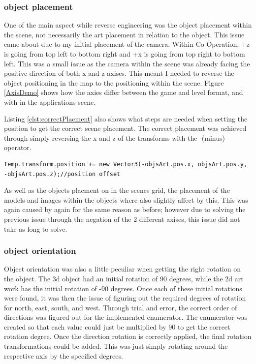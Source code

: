 \subsubsection{object placement}
One of the main aspect while reverse engineering was the object placement within the scene, not necessarily the art placement in relation to the object. This issue came about due to my initial placement of the camera. Within Co-Operation, +z is going from top left to bottom right and +x is going from top right to bottom left. This was a small issue as the camera within the scene was already facing the positive direction of both x and z axises. This meant I needed to reverse the object positioning in the map to the positioning within the scene. Figure \ref{AxisDemo} shows how the axies differ between the game and level format, and with in the applications scene.

Listing \ref{clst:correctPlacment} also shows what steps are needed when setting the position to get the correct scene placement. The correct placement was achieved through simply reversing the x and z of the transforms with the -(minus) operator.
\begin{lstlisting}[language={[Sharp]C}, caption=C\# code for correcting object placement from file to scene, label=clst:correctPlacment]
Temp.transform.position += new Vector3(-objsArt.pos.x, objsArt.pos.y, -objsArt.pos.z);//position offset
\end{lstlisting}

As well as the objects placment on in the scenes grid, the placement of the models and images within the objects where also slightly affect by this. This was again caused by again for the same reason as before; however due to solving the previous issue through the negation of the 2 different axises, this issue did not take as long to solve.

\subsubsection{object orientation}
Object orientation was also a little peculiar when getting the right rotation on the object. The 3d object had an initial rotation of 90 degrees, while the 2d art work has the initial rotation of -90 degrees. Once each of these initial rotations were found, it was then the issue of figuring out the required degrees of rotation for north, east, south, and west.  Through trial and error, the correct order of directions was figured out for the implemented enumerator. The enumerator was created so that each value could just be multiplied by 90 to get the correct rotation degree. Once the direction rotation is correctly applied, the final rotation transformations could be added. This was just simply rotating around the respective axis by the specified degrees.

